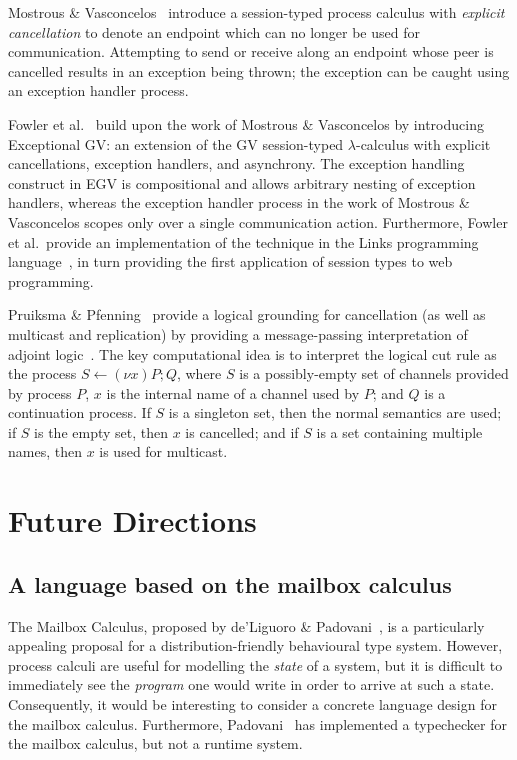 \documentclass[
graybox,
envcountchap
]{svmult}
\begin{document}
\begin{bibunit}
  Mostrous \& Vasconcelos~\cite{MostrousV18:affine} introduce a session-typed
  process calculus with \emph{explicit cancellation} to denote an endpoint which
  can no longer be used for communication. Attempting to send or receive along
  an endpoint whose peer is cancelled results in an exception being thrown; the
  exception can be caught using an exception handler process.

  Fowler et al.~\cite{FowlerLMD19:stwt} build upon the work of Mostrous \&
  Vasconcelos by introducing Exceptional GV: an extension of the GV
  session-typed $\lambda$-calculus with explicit cancellations, exception
  handlers, and asynchrony. The exception handling construct in EGV is
  compositional and allows arbitrary nesting of exception handlers, whereas the
  exception handler process in the work of Mostrous \& Vasconcelos scopes only
  over a single communication action. Furthermore, Fowler et al.\ provide an
  implementation of the technique in the Links programming
  language~\cite{CooperLWY06:links}, in turn providing the first application of
  session types to web programming.

  Pruiksma \& Pfenning~\cite{PruiksmaP19:mp-adjoint} provide a logical grounding
  for cancellation (as well as multicast and replication) by providing a
  message-passing interpretation of adjoint logic~\cite{PruiksmaCPR18:adjoint}.
  The key computational idea is to interpret the logical cut rule as the process
  $S \leftarrow (\nu x) P; Q$, where $S$ is a possibly-empty set of channels
  provided by process $P$, $x$ is the internal name of a channel used by $P$;
  and $Q$ is a continuation process. If $S$ is a singleton set, then the normal
  semantics are used; if $S$ is the empty set, then $x$ is cancelled; and if $S$
  is a set containing multiple names, then $x$ is used for multicast.

  \section{Future Directions}\label{sec:bt:future}

  \subsection{A language based on the mailbox calculus}
  The Mailbox Calculus, proposed by de'Liguoro \&
  Padovani~\cite{deLiguoroP18:mailbox}, is a particularly
  appealing proposal for a distribution-friendly behavioural type system.
  However, process calculi are useful for modelling the \emph{state} of a
  system, but it is difficult to immediately see the \emph{program} one would
  write in order to arrive at such a state. Consequently, it would be
  interesting to consider a concrete language design for the mailbox calculus.
  Furthermore, Padovani~\cite{Padovani18:mc2} has implemented a typechecker for
  the mailbox calculus, but not a runtime system.


\end{bibunit}
\end{document}
